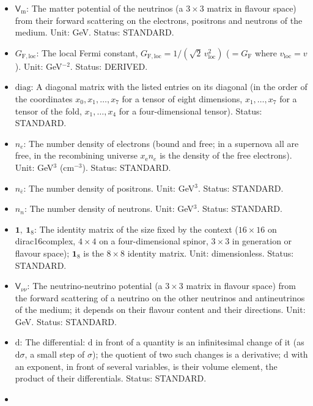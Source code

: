 \documentclass[
  10pt,
]{article}
\providecommand{\tightlist}{%
  \setlength{\itemsep}{0pt}\setlength{\parskip}{0pt}}
\begin{document}
\begin{itemize}
\tightlist
\item
  \(\mathsf{V}_{\mathrm{m}}\): The matter potential of the neutrinos (a
  \(3 \times 3\) matrix in flavour space) from their forward scattering
  on the electrons, positrons and neutrons of the medium. Unit: GeV.
  Status: STANDARD.
\item
  \(G_{\mathrm{F,loc}}\): The local Fermi constant,
  \(G_{\mathrm{F,loc}} = 1/(\sqrt2\,v_{\mathrm{loc}}^2)\)
  (\(= G_{\mathrm{F}}\) where \(v_{\mathrm{loc}} = v\)). Unit:
  GeV\(^{-2}\). Status: DERIVED.
\item
  \(\mathrm{diag}\): A diagonal matrix with the listed entries on its
  diagonal (in the order of the coordinates \(x_0, x_1, \dots, x_7\) for
  a tensor of eight dimensions, \(x_1, \dots, x_7\) for a tensor of the
  fold, \(x_1, \dots, x_4\) for a four-dimensional tensor). Status:
  STANDARD.
\item
  \(n_e\): The number density of electrons (bound and free; in a
  supernova all are free, in the recombining universe
  \(x_{\mathrm{e}}n_e\) is the density of the free electrons). Unit:
  GeV\(^3\) (cm\(^{-3}\)). Status: STANDARD.
\item
  \(n_{\bar e}\): The number density of positrons. Unit: GeV\(^3\).
  Status: STANDARD.
\item
  \(n_n\): The number density of neutrons. Unit: GeV\(^3\). Status:
  STANDARD.
\item
  \(\mathbf{1},\ \mathbf{1}_8\): The identity matrix of the size fixed
  by the context (\(16 \times 16\) on dirac16complex, \(4 \times 4\) on
  a four-dimensional spinor, \(3 \times 3\) in generation or flavour
  space); \(\mathbf{1}_8\) is the \(8 \times 8\) identity matrix. Unit:
  dimensionless. Status: STANDARD.
\item
  \(\mathsf{V}_{\nu\nu}\): The neutrino-neutrino potential (a
  \(3 \times 3\) matrix in flavour space) from the forward scattering of
  a neutrino on the other neutrinos and antineutrinos of the medium; it
  depends on their flavour content and their directions. Unit: GeV.
  Status: STANDARD.
\item
  \(\mathrm{d}\): The differential: \(\mathrm{d}\) in front of a
  quantity is an infinitesimal change of it (as \(\mathrm{d}\sigma\), a
  small step of \(\sigma\)); the quotient of two such changes is a
  derivative; \(\mathrm{d}\) with an exponent, in front of several
  variables, is their volume element, the product of their
  differentials. Status: STANDARD.
\item

\end{itemize}
\end{document}
